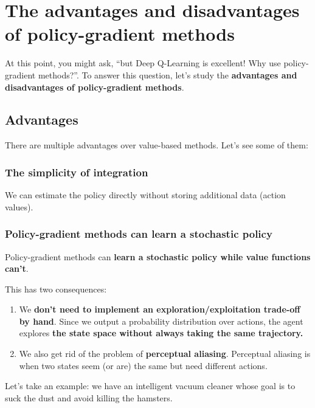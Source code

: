 \documentclass[11pt,a4paper]{article}
\begin{document}
\section{The advantages and disadvantages of policy-gradient methods}\label{the-advantages-and-disadvantages-of-policy-gradient-methods}

At this point, you might ask, ``but Deep Q-Learning is excellent! Why use policy-gradient methods?''. To answer this question, let's study the \textbf{advantages and disadvantages of policy-gradient methods}.

\subsection{Advantages}\label{advantages}

There are multiple advantages over value-based methods. Let's see some of them:

\subsubsection{The simplicity of integration}\label{the-simplicity-of-integration}

We can estimate the policy directly without storing additional data (action values).

\subsubsection{Policy-gradient methods can learn a stochastic policy}\label{policy-gradient-methods-can-learn-a-stochastic-policy}

Policy-gradient methods can \textbf{learn a stochastic policy while value functions can't}.

This has two consequences:

\begin{enumerate}
\def\labelenumi{\arabic{enumi}.}
\item
  We \textbf{don't need to implement an exploration/exploitation trade-off by hand}. Since we output a probability distribution over actions, the agent explores \textbf{the state space without always taking the same trajectory.}
\item
  We also get rid of the problem of \textbf{perceptual aliasing}. Perceptual aliasing is when two states seem (or are) the same but need different actions.
\end{enumerate}

Let's take an example: we have an intelligent vacuum cleaner whose goal is to suck the dust and avoid killing the hamsters.
\end{document}
